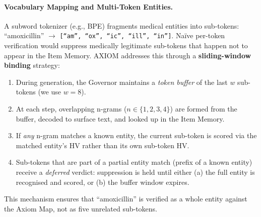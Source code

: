 \documentclass[11pt,a4paper]{article}
\begin{document}
\paragraph{Vocabulary Mapping and Multi-Token Entities.}
A subword tokenizer (e.g., BPE) fragments medical entities into
sub-tokens: ``amoxicillin'' $\to$ \texttt{[``am'', ``ox'', ``ic'',
``ill'', ``in'']}.  Na\"ive per-token verification would suppress
medically legitimate sub-tokens that happen not to appear in the Item
Memory.  AXIOM addresses this through a \textbf{sliding-window binding}
strategy:
\begin{enumerate}[nosep]
    \item During generation, the Governor maintains a \emph{token buffer}
          of the last $w$ sub-tokens (we use $w = 8$).
    \item At each step, overlapping n-grams ($n \in \{1, 2, 3, 4\}$) are
          formed from the buffer, decoded to surface text, and looked up
          in the Item Memory.
    \item If \emph{any} n-gram matches a known entity, the current
          sub-token is scored via the matched entity's HV rather than
          its own sub-token HV.
    \item Sub-tokens that are part of a partial entity match (prefix of a
          known entity) receive a \emph{deferred} verdict: suppression
          is held until either (a) the full entity is recognised and
          scored, or (b) the buffer window expires.
\end{enumerate}
This mechanism ensures that ``amoxicillin'' is verified as a whole entity
against the Axiom Map, not as five unrelated sub-tokens.
\end{document}

